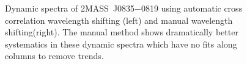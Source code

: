 \documentclass[twocolumn]{aastex6}
\newcommand{\sha}{2MASS~J0835$-$0819}
\begin{document}
\begin{figure}[!t]
\centering
{}
	\caption{Dynamic spectra of {\sha} using automatic cross correlation wavelength shifting (left) and manual wavelength shifting(right).
	The manual method shows dramatically better systematics in these dynamic spectra which have no fits along columns to remove trends.}
	\label{fig:manualVsAutoShift0835}
	\vspace{0.1in}
\end{figure} 
\end{document}
